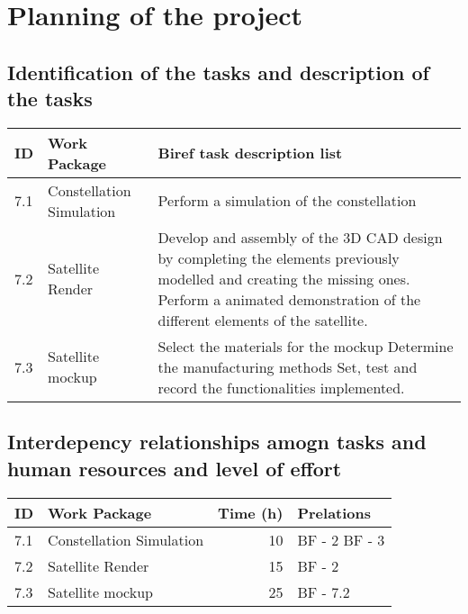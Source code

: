 \documentclass[12pt, titlepage]{article}
\begin{document}
\maketitle

\pagebreak


\section{Planning of the project}


\subsection{Identification of the tasks and description of the tasks}
\begin{tabular}{ | l | p{4cm} | p{8cm} |}
\hline
ID & Work Package & Biref task description list \\ \hline

7.1 & Constellation Simulation & 

Perform a simulation of the constellation \\ \hline

7.2 & Satellite Render & 

Develop and assembly of the 3D CAD design by completing the elements previously modelled and creating the missing ones. \newline
Perform a animated demonstration of the different elements of the satellite.\\ \hline

7.3 & Satellite mockup & 

Select the materials for the mockup \newline
Determine the manufacturing methods \newline
Set, test and record the functionalities implemented. \\ \hline
\end{tabular}


\subsection{Interdepency relationships amogn tasks and human resources and level of effort}
\begin{tabular}{ | l | p{7cm} | r | p{3cm} | }
\hline
ID & Work Package & Time (h) & Prelations \\ \hline
7.1 & Constellation Simulation & 10 & BF - 2 \newline BF - 3 \\ \hline
7.2 & Satellite Render & 15 & BF - 2 \\ \hline
7.3 & Satellite mockup & 25 & BF - 7.2 \\
\hline
\end{tabular}
\end{document}
